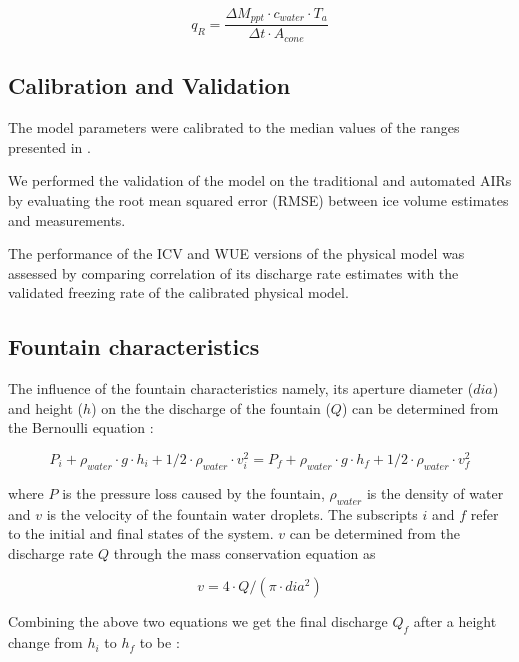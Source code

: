 \documentclass[tc, manuscript]{copernicus}
\begin{document}
\begin{equation}
  q_{R} = \frac{\Delta M_{ppt} \cdot c_{water} \cdot T_{a}}{\Delta t \cdot A_{cone}}
\end{equation}

\subsection{Calibration and Validation}

The model parameters were calibrated to the median values of the ranges presented in
\cite{balasubramanianInfluenceMeteorologicalConditions2022}.

We performed the validation of the model on the traditional and automated AIRs by evaluating the root mean
squared error (RMSE) between ice volume estimates and measurements. 

The performance of the ICV and WUE versions of the physical model was assessed by comparing correlation of its
discharge rate estimates with the validated freezing rate of the calibrated physical model.

\subsection{Fountain characteristics}

The influence of the fountain characteristics namely, its aperture diameter ($dia$) and height ($h$) on the
the discharge of the fountain ($Q$) can be determined from the Bernoulli equation :

\begin{equation}
  \label{eqn:fountain}
  P_{i} + \rho_{water} \cdot g \cdot h_{i} + 1/2 \cdot \rho_{water} \cdot v_{i}^2 = P_{f} + \rho_{water} \cdot g
  \cdot h_{f} + 1/2 \cdot \rho_{water} \cdot v_{f}^2
\end{equation}

where $P$ is the pressure loss caused by the fountain, $\rho_{water}$ is the density of water and $v$ is the
velocity of the fountain water droplets. The subscripts $i$ and $f$ refer to the initial and final states of the
system. $v$ can be determined from the discharge rate $Q$ through the mass conservation equation as 

\begin{equation}
 v = 4 \cdot Q/(\pi \cdot dia^2)
\end{equation}

Combining the above two equations we get the final discharge $Q_f$ after a height change from $h_i$ to $h_f$ to be :
\end{document}
